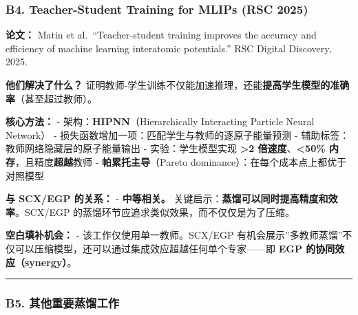 \documentclass[
  12pt,
]{ctexart}
\begin{document}
\subsubsection{B4. Teacher-Student Training for MLIPs (RSC
2025)}\label{b4.-teacher-student-training-for-mlips-rsc-2025}

\textbf{论文：} Matin et al.~``Teacher-student training improves the
accuracy and efficiency of machine learning interatomic potentials.''
RSC Digital Discovery, 2025.

\textbf{他们解决了什么？}
证明教师-学生训练不仅能加速推理，还能\textbf{提高学生模型的准确率}（甚至超过教师）。

\textbf{核心方法：} - 架构：\textbf{HIPNN}（Hierarchically Interacting
Particle Neural Network） -
损失函数增加一项：匹配学生与教师的逐原子能量预测 -
辅助标签：教师网络隐藏层的原子能量输出 - 实验：学生模型实现
\textbf{\textgreater2 倍速度}、\textbf{\textless50\%
内存}，且精度\textbf{超越}教师 - \textbf{帕累托主导}（Pareto
dominance）：在每个成本点上都优于对照模型

\textbf{与 SCX/EGP 的关系：} - \textbf{中等相关。}
关键启示：\textbf{蒸馏可以同时提高精度和效率}。SCX/EGP
的蒸馏环节应追求类似效果，而不仅仅是为了压缩。

\textbf{空白填补机会：} - 该工作仅使用单一教师。SCX/EGP
有机会展示''多教师蒸馏''不仅可以压缩模型，还可以通过集成效应超越任何单个专家------即
\textbf{EGP 的协同效应（synergy）}。

\begin{center}\rule{0.5\linewidth}{0.5pt}\end{center}

\subsubsection{B5.
其他重要蒸馏工作}\label{b5.-ux5176ux4ed6ux91cdux8981ux84b8ux998fux5de5ux4f5c}
\end{document}
